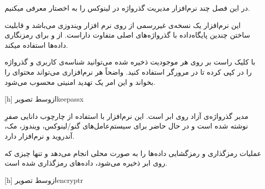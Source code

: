 
در این فصل چند نرم‌افزار مدیریت گذرواژه در لینوکس را به اخصتار معرفی میکنیم. 


این نرم‌افزار یک نسخه‌ی غیررسمی از روی نرم افزار ویندوزی  می‌باشد و قابلیت ساختن چندین پایگاه‌داده با گذرواژه‌های اصلی متفاوت داراست.  از  و  برای رمز‌نگاری داده‌ها استفاده میکند. 

با کلیک راست بر روی هر موجودیت ذخیره شده می‌توانید شناسه‌ی کاربری و گذرواژه را در  کپی کرده تا در مرورگر استفاده کنید. واضحاً هر نرم‌افزاری می‌تواند محتوای  را بخواند و این امر یک تهدید امنیتی محسوب می‌شود.

[h]
‌ازوسط
‌تصویر{keepassx}


 مدیر گذرواژه‌ی آزاد روی ابر است. این نرم‌افزار با استفاده از چارچوب دانایی صفرِ  نوشته شده است و در حال حاضر برای سیستم‌عامل‌های گنو/لینوکس، ویندوز، مک، آندروید و  نرم‌افزار دارد. 

 عملیات رمزگذاری و رمزگشایی داده‌ها را به صورت محلی انجام می‌دهد و تنها چیزی که روی ابر ذخیره می‌شود، داده‌های رمز‌گذاری شده است.


[h]
‌ازوسط
‌تصویر{encryptr}






